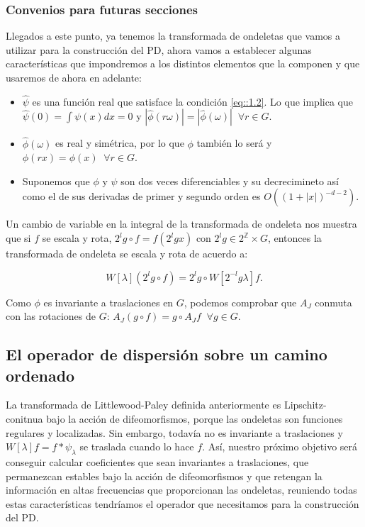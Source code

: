 \medskip


\subsubsection{Convenios para futuras secciones}

\noindent Llegados a este punto, ya tenemos la transformada de ondeletas que vamos a utilizar para la construcción del PD, ahora vamos a establecer algunas características que impondremos a los distintos elementos que la componen y que usaremos de ahora en adelante: 

\begin{itemize}
    \item $\widehat{\psi}$ es una función real que satisface la condición \eqref{eq::1.2}. Lo que implica que $\widehat{\psi}(0)=\int \psi(x)dx=0$ y $|\widehat{\phi}(r\omega)|=|\widehat{\phi}(\omega)| \;\; \forall r\in G$.
    \item $\widehat{\phi}(\omega)$ es real y simétrica, por lo que $\phi$ también lo será y $\phi(rx)=\phi(x) \;\; \forall r \in G$. 
    \item Suponemos que $\phi$ y $\psi$ son dos veces diferenciables y su decrecimineto así como el de sus derivadas de primer y segundo orden es $O((1+|x|)^{-d-2})$.
\end{itemize}

\medskip

\noindent Un cambio de variable en la integral de la transformada de ondeleta nos muestra que si $f$ se escala y rota, $2^lg \circ f=f(2^lgx)$ con $2^lg \in 2^{\mathbb{Z}} \times G$, entonces la transformada de ondeleta se escala y rota de acuerdo a: 

\begin{equation}
  W[\lambda](2^lg\circ f)=2^lg \circ W[2^{-l}g\lambda]f.
\end{equation}

\medskip

\noindent Como $\phi$ es invariante a traslaciones en $G$, podemos comprobar que $A_J$ conmuta con las rotaciones de $G$: $A_J(g\circ f)=g\circ A_J f \;\; \forall g \in G$. 

\subsection{El operador de dispersión sobre un camino ordenado}

\noindent La transformada de Littlewood-Paley definida anteriormente es Lipschitz-conitnua bajo la acción de difeomorfismos, porque las ondeletas son funciones regulares y localizadas. Sin embargo, todavía no es invariante a traslaciones y $W[\lambda]f=f\ast\psi_\lambda$ se traslada cuando lo hace $f$. Así, nuestro próximo objetivo será conseguir calcular coeficientes que sean invariantes a traslaciones, que permanezcan estables bajo la acción de difeomorfismos y que retengan la información en altas frecuencias que proporcionan las ondeletas, reuniendo todas estas características tendríamos el operador que necesitamos para la construcción del PD. 

